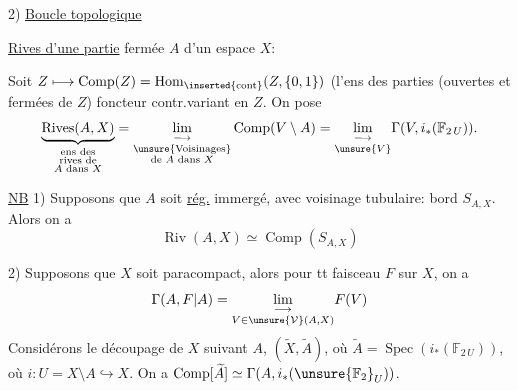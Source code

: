 
2) \uline{Boucle topologique}

 \uline{Rives d'une partie} fermée $A$ d'un espace $X$: 

Soit $Z\longmapsto\operatorname{Comp}(Z)=\operatorname{Hom}_{\inserted{\mathrm{cont}}}(Z,\{0,1\})$ 
(l'ens des parties  (ouvertes et fermées de $Z$) foncteur contr.variant en $Z$. On pose
\[
\underbrace{\operatorname{Rives}(A,X)}_{\substack{\text{ens des}\\\text{rives de}\\A\text{ dans }X}}
=\underset{\substack{\text{\unsure{Voisinages}}\\\text{de }A\text{ dans }X}}{\lim_{\longrightarrow}}
\operatorname{Comp}(V\setminus A)
=\underset{\unsure{V}}{\lim_{\longrightarrow}}\Gamma(V,i_*(\mathbb F_{2\,U})).
\]

\uline{NB} 1) Supposons que $A$ soit \uline{rég.} immergé, avec voisinage tubulaire: bord $S_{A,X}$. Alors on a
\[
\operatorname{Riv}(A,X)\simeq\operatorname{Comp}(S_{A,X})
\]

2) Supposons que $X$ soit paracompact, alors pour tt faisceau $F$ sur $X$, on a
\[
\Gamma(A,F|A)=\underset{V\in\unsure{\mathcal V}(A,X)}{\lim_{\longrightarrow}}F(V)
\]
Considérons le découpage de $X$ suivant $A$, $(\widetilde X,\widetilde A)$, où
$\widetilde A=\operatorname{Spec}(i_*(\mathbb F_{2\,U}))$, où $i:U=X\setminus A\hookrightarrow X$.
 On a $\operatorname{Comp}[\widetilde A]\simeq\Gamma(A,i_*({\unsure{\mathbb F_2}}_{U}))$.

